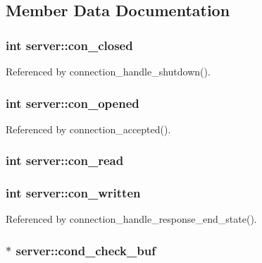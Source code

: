 \subsection{Member Data Documentation}
\hypertarget{structserver_aee61b289e4e095db5620202e75b2ca90}{
\subsubsection[{con\-\_\-closed}]{\setlength{\rightskip}{0pt plus 5cm}int server\-::con\-\_\-closed}}\label{structserver_aee61b289e4e095db5620202e75b2ca90}


Referenced by connection\-\_\-handle\-\_\-shutdown().

\hypertarget{structserver_a443bc75596c08290e8418a8666630260}{
\subsubsection[{con\-\_\-opened}]{\setlength{\rightskip}{0pt plus 5cm}int server\-::con\-\_\-opened}}\label{structserver_a443bc75596c08290e8418a8666630260}


Referenced by connection\-\_\-accepted().

\hypertarget{structserver_ace5fa64dcce8c9732dc7b6a9015977e7}{
\subsubsection[{con\-\_\-read}]{\setlength{\rightskip}{0pt plus 5cm}int server\-::con\-\_\-read}}\label{structserver_ace5fa64dcce8c9732dc7b6a9015977e7}
\hypertarget{structserver_ad04bd631448024d1763ff54c2b620723}{
\subsubsection[{con\-\_\-written}]{\setlength{\rightskip}{0pt plus 5cm}int server\-::con\-\_\-written}}\label{structserver_ad04bd631448024d1763ff54c2b620723}


Referenced by connection\-\_\-handle\-\_\-response\-\_\-end\-\_\-state().

\hypertarget{structserver_a4f9bccd17cbfc67b09a83b5ed8b7999f}{
\subsubsection[{cond\-\_\-check\-\_\-buf}]{$\ast$ server\-::cond\-\_\-check\-\_\-buf}}\label{structserver_a4f9bccd17cbfc67b09a83b5ed8b7999f}


